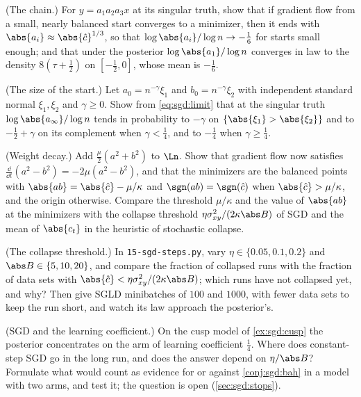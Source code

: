 \begin{refsection}
\begin{exercises}
\item \byhand (The chain.) For $y=a_1a_2a_3x$ at its singular truth, show that if gradient flow from a small, nearly balanced start converges to a minimizer, then it ends with $\abs{a_i}\approx\abs{\hat c}^{1/3}$, so that $\log\abs{a_i}/\log n\to-\frac16$ for starts small enough; and that under the posterior $\log\abs{a_1}/\log n$ converges in law to the density $8(\tau+\frac12)$ on $[-\frac12,0]$, whose mean is $-\frac16$.\label{ex:sgd:chain}

\item \byhand (The size of the start.) Let $a_0=n^{-\gamma}\xi_1$ and $b_0=n^{-\gamma}\xi_2$ with independent standard normal $\xi_1,\xi_2$ and $\gamma\ge0$. Show from \eqref{eq:sgd:limit} that at the singular truth $\log\abs{a_\infty}/\log n$ tends in probability to $-\gamma$ on $\{\abs{\xi_1}>\abs{\xi_2}\}$ and to $-\frac12+\gamma$ on its complement when $\gamma<\frac14$, and to $-\frac14$ when $\gamma\ge\frac14$.\label{ex:sgd:scale}

\item \variation (Weight decay.) Add $\frac\mu2(a^2+b^2)$ to $\Ln$. Show that gradient flow now satisfies $\frac{\dd}{\dd t}(a^2-b^2)=-2\mu(a^2-b^2)$, and that the minimizers are the balanced points with $\abs{ab}=\abs{\hat c}-\mu/\kappa$ and $\sgn(ab)=\sgn(\hat c)$ when $\abs{\hat c}>\mu/\kappa$, and the origin otherwise. Compare the threshold $\mu/\kappa$ and the value of $\abs{ab}$ at the minimizers with the collapse threshold $\eta\sgdvar/(2\kappa\abs B)$ of SGD and the mean of $\abs{c_t}$ in the heuristic of stochastic collapse.\label{ex:sgd:wd}

\item \measurement (The collapse threshold.) In \texttt{15-sgd-steps.py}, vary $\eta\in\{0.05,0.1,0.2\}$ and $\abs B\in\{5,10,20\}$, and compare the fraction of collapsed runs with the fraction of data sets with $\abs{\hat c}<\eta\sgdvar/(2\kappa\abs B)$; which runs have not collapsed yet, and why? Then give SGLD minibatches of $100$ and $1000$, with fewer data sets to keep the run short, and watch its law approach the posterior's.\label{ex:sgd:collapse}

\item \research (SGD and the learning coefficient.) On the cusp model of \cref{ex:sgd:cusp} the posterior concentrates on the arm of learning coefficient $\frac14$. Where does constant-step SGD go in the long run, and does the answer depend on $\eta/\abs B$? Formulate what would count as evidence for or against \cref{conj:sgd:bah} in a model with two arms, and test it; the question is open (\cref{sec:sgd:stops}).\label{ex:sgd:research}
\end{exercises}


\end{refsection}
